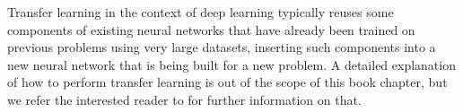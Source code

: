 Transfer learning in the context of deep learning typically reuses some components of existing neural networks that have already been trained on previous problems using very large datasets, inserting such components into a new neural network that is being built for a new problem. A detailed explanation of how to perform transfer learning is out of the scope of this book chapter, but we refer the interested reader to \cite{elgendy2020} for further information on that.

%
%
%
%
%
%
